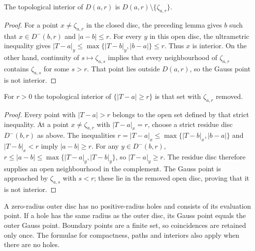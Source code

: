 \begin{lemma}\label{lem:fc-closed-disc-interior}
\leanok
The topological interior of $D(a,r)$ is $D(a,r)\setminus\{\zeta_{a,r}\}$.
\end{lemma}

\begin{proof}
For a point $x\ne\zeta_{a,r}$ in the closed disc, the preceding lemma gives
$b$ such that $x\in D^-(b,r)$ and $|a-b|\le r$. For every $y$ in this open
disc, the ultrametric inequality gives
$|T-a|_y\le\max\{|T-b|_y,|b-a|\}\le r$. Thus $x$ is interior.
On the other hand, continuity of $s\mapsto\zeta_{a,s}$ implies that every
neighbourhood of $\zeta_{a,r}$ contains $\zeta_{a,s}$ for some $s>r$.
That point lies outside $D(a,r)$, so the Gauss point is not interior.
\end{proof}

\begin{lemma}\label{lem:fc-disc-exterior-interior}
\leanok
For $r>0$ the topological interior of $\{|T-a|\ge r\}$ is that set with
$\zeta_{a,r}$ removed.
\end{lemma}

\begin{proof}
Every point with $|T-a|>r$ belongs to the open set defined by that strict
inequality. At a point $x\ne\zeta_{a,r}$ with $|T-a|_x=r$, choose a strict
residue disc $D^-(b,r)$ as above. The inequalities
$r=|T-a|_x\le\max\{|T-b|_x,|b-a|\}$ and $|T-b|_x<r$ imply
$|a-b|\ge r$. For any $y\in D^-(b,r)$,
$r\le|a-b|\le\max\{|T-a|_y,|T-b|_y\}$, so $|T-a|_y\ge r$.
The residue disc therefore supplies an open neighbourhood in the complement.
The Gauss point is approached by $\zeta_{a,s}$ with $s<r$; these lie in the
removed open disc, proving that it is not interior.
\end{proof}

\begin{remark}\label{rmk:fc-standard-degenerate}
\leanok
A zero-radius outer disc has no positive-radius holes and consists of its
evaluation point. If a hole has the same radius as the outer disc, its Gauss
point equals the outer Gauss point. Boundary points are a finite set, so
coincidences are retained only once. The formulae for compactness, paths and
interiors also apply when there are no holes.
\end{remark}

